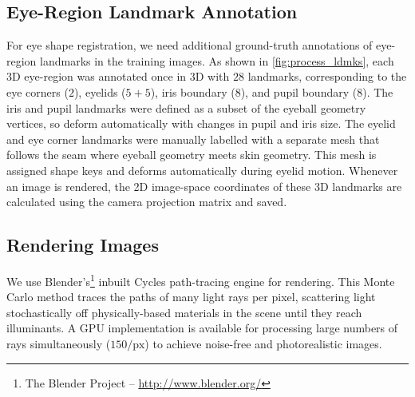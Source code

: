 \subsection{Eye-Region Landmark Annotation}

For eye shape registration, we need additional ground-truth annotations of eye-region landmarks in the training images.
As shown in \autoref{fig:process_ldmks}, each 3D eye-region was annotated once in 3D with $28$ landmarks, corresponding to the eye corners ($2$), eyelids ($5\!+\!5$), iris boundary ($8$), and pupil boundary ($8$).
The iris and pupil landmarks were defined as a subset of the eyeball geometry vertices, so deform automatically with changes in pupil and iris size.
The eyelid and eye corner landmarks were manually labelled with a separate mesh that follows the seam where eyeball geometry meets skin geometry.
This mesh is assigned shape keys and deforms automatically during eyelid motion.
%
Whenever an image is rendered, the 2D image-space coordinates of these 3D landmarks are calculated using the camera projection matrix and saved.

\subsection{Rendering Images}

We use Blender's\footnote{The Blender Project -- \url{http://www.blender.org/}} inbuilt Cycles path-tracing engine for rendering.
This Monte Carlo method traces the paths of many light rays per pixel, scattering light stochastically off physically-based materials in the scene until they reach illuminants.
A GPU implementation is available for processing large numbers of rays simultaneously ($150/\textrm{px}$) to achieve noise-free and photorealistic images.

